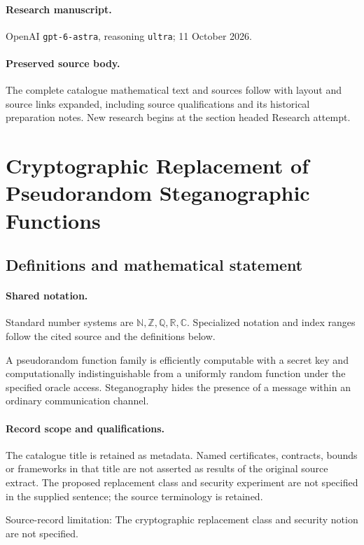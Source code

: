 \documentclass[11pt]{article}
\begin{document}
\paragraph{Research manuscript.} OpenAI \texttt{gpt-6-astra}, reasoning \texttt{ultra}; 11 October 2026.
\paragraph{Preserved source body.} The complete catalogue mathematical text and sources follow with layout and source links expanded, including source qualifications and its historical preparation notes. New research begins at the section headed Research attempt.

\section{Cryptographic Replacement of Pseudorandom Steganographic Functions}\label{statement}

\subsection{Definitions and mathematical statement}

\paragraph{Shared notation.}Standard number systems are $\mathbb N,\mathbb Z,\mathbb Q,\mathbb R,\mathbb C$. Specialized notation and index ranges follow the cited source and the definitions below.


A pseudorandom function family is efficiently computable with a secret key and computationally indistinguishable from a uniformly random function under the specified oracle access. Steganography hides the presence of a message within an ordinary communication channel.
\paragraph{Record scope and qualifications.}
The catalogue title is retained as metadata. Named certificates, contracts, bounds or frameworks in that title are not asserted as results of the original source extract.
The proposed replacement class and security experiment are not specified in the supplied sentence; the source terminology is retained.

Source-record limitation: The cryptographic replacement class and security notion are not specified.
\end{document}
